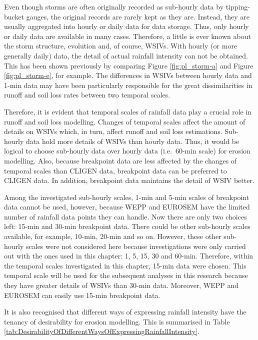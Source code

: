 Even though storms are often originally recorded as sub-hourly data by
tipping-bucket gauges, the original records are rarely kept as they are.
Instead, they are usually aggregated into hourly or daily data for data storage.
Thus, only hourly or daily data are available in many cases.
Therefore, a little is ever known about the storm structure, evolution and, of
course, WSIVs. With hourly (or more generally daily) data, the detail of
actual rainfall intensity can not be obtained. This has been shown
previously by comparing Figure \ref{fig:pl_storm-a} and Figure
\ref{fig:pl_storm-e}, for example. The differences in WSIVs between hourly data
and 1-min data may have been particularly responsible for the great
dissimilarities in runoff and soil loss rates between two temporal scales.

Therefore, it is evident that temporal scales of rainfall data play a crucial
role in runoff and soil loss modelling. Changes of temporal scales affect the
amount of details on WSIVs which, in turn, affect runoff and soil loss
estimations.
Sub-hourly data hold more details of WSIVs than hourly data. Thus, it would be
logical to choose sub-hourly data over hourly data (i.e.\ 60-min scale) for
erosion modelling. Also, because breakpoint data are less affected by the
changes of temporal scales than CLIGEN data, breakpoint data can be preferred to
CLIGEN data. In addition, breakpoint data maintains the detail of WSIV better.

Among the investigated sub-hourly scales, 1-min and 5-min scales of breakpoint
data cannot be used, however, because WEPP and EUROSEM have the limited number
of rainfall data points they can handle. Now there are only two choices left:
15-min and 30-min breakpoint data.
There could be other sub-hourly scales available, for example, 10-min, 20-min
and so on. However, these other sub-hourly scales were not considered here
because investigations were only carried out with the ones used in this chapter:
1, 5, 15, 30 and 60-min. Therefore, within the temporal scales investigated in
this chapter, 15-min data were chosen. This temporal scale will be used for the
subsequent analyses in this research because they have greater details of WSIVs
than 30-min data. Moreover, WEPP and EUROSEM can easily use 15-min breakpoint
data.

It is also recognised that different ways of expressing rainfall intensity have
the tenancy of desirability for erosion modelling. This is summarised in Table
\ref{tab:DesirabilityOfDifferentWaysOfExpressingRainfallIntensity}.

